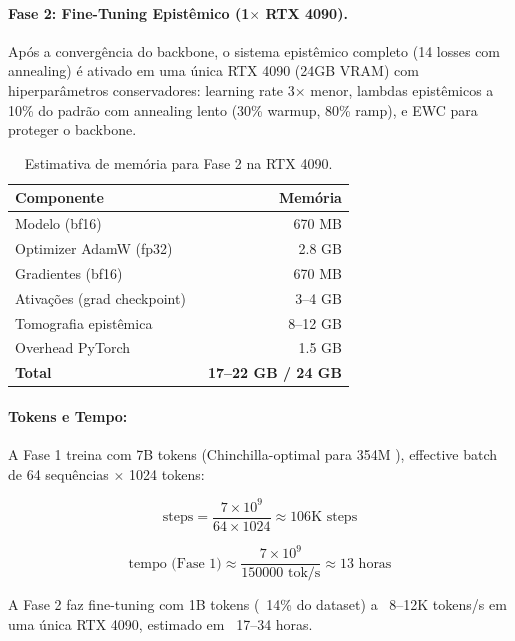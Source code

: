 \paragraph{Fase 2: Fine-Tuning Epist\^emico (1$\times$ RTX 4090).}
Ap\'os a converg\^encia do backbone, o sistema epist\^emico completo (14 losses com
annealing) \'e ativado em uma \'unica RTX 4090 (24GB VRAM) com hiperpar\^ametros
conservadores: learning rate 3$\times$ menor, lambdas epist\^emicos a 10\% do padr\~ao
com annealing lento (30\% warmup, 80\% ramp), e EWC para proteger o backbone.

\begin{table}[H]
\centering
\caption{Estimativa de mem\'oria para Fase 2 na RTX 4090.}
\label{tab:memory}
\begin{tabular}{lr}
\toprule
\textbf{Componente} & \textbf{Mem\'oria} \\
\midrule
Modelo (bf16) & ~670 MB \\
Optimizer AdamW (fp32) & ~2.8 GB \\
Gradientes (bf16) & ~670 MB \\
Ativa\c{c}\~oes (grad checkpoint) & ~3--4 GB \\
Tomografia epist\^emica & ~8--12 GB \\
Overhead PyTorch & ~1.5 GB \\
\midrule
\textbf{Total} & \textbf{~17--22 GB / 24 GB} \\
\bottomrule
\end{tabular}
\end{table}

\paragraph{Tokens e Tempo:}
A Fase 1 treina com 7B tokens (Chinchilla-optimal para 354M \cite{hoffmann2022chinchilla}),
effective batch de 64 sequ\^encias $\times$ 1024 tokens:

\begin{equation}
    \text{steps} = \frac{7 \times 10^9}{64 \times 1024} \approx 106\text{K steps}
\end{equation}

\begin{equation}
    \text{tempo (Fase 1)} \approx \frac{7 \times 10^9}{150000 \text{ tok/s}} \approx 13 \text{ horas}
\end{equation}

A Fase 2 faz fine-tuning com 1B tokens (~14\% do dataset) a ~8--12K tokens/s
em uma \'unica RTX 4090, estimado em ~17--34 horas.

